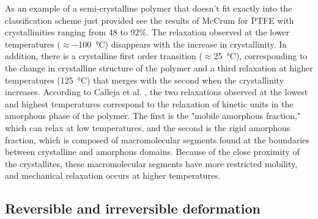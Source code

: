 As an example of a semi-crystalline polymer that doesn't fit exactly into the classification scheme just provided see the results of McCrum \cite{mccrumStudyInternalFriction1959} for PTFE with crystallinities ranging from 48 to 92\%.
The relaxation observed at the lower temperatures ($\approx$\SI{-100}{\celsius}) disappears with the increase in crystallinity.
In addition, there is a crystalline first order transition ($\approx$\SI{25}{\celsius}), corresponding to the change in crystalline structure of the polymer and a third relaxation at higher temperatures (\SI{125}{\celsius}) that merges with the second when the crystallinity increases.
According to Calleja et al. \citep{callejaWhereGlassTransition2013}, the two relaxations observed at the lowest and highest temperatures correspond to the relaxation of kinetic units in the amorphous phase of the polymer.
The first is the "mobile amorphous fraction," which can relax at low temperatures, and the second is the rigid amorphous fraction, which is composed of macromolecular segments found at the boundaries between crystalline and amorphous domains.
Because of the close proximity of the crystallites, these macromolecular segments have more restricted mobility, and mechanical relaxation occurs at higher temperatures.



\subsection{Reversible and irreversible deformation}
\label{sec:reversible_and_irreversible_deformation}

